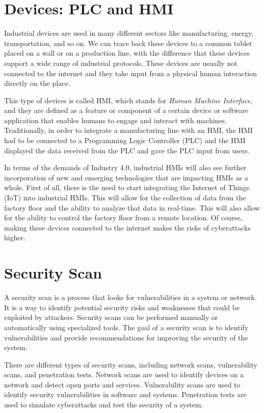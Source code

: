 \section{Devices: PLC and HMI}

Industrial devices are used in many different sectors like manufacturing, energy, transportation, and so on. We can trace back these devices to a common tablet placed on a wall or on a production line, with the difference that these devices support a wide range of industrial protocols. These devices are usually not connected to the internet and they take input from a physical human interaction directly on the place.

This type of devices is called HMI, which stands for \textit{Human Machine Interface}, and they are defined as a feature or component of a certain device or software application that enables humans to engage and interact with machines.\\
Traditionally, in order to integrate a manufacturing line with an HMI, the HMI had to be connected to a Programming Logic Controller (PLC) and the HMI displayed the data received from the PLC and gave the PLC input from users.~\cite{what-is-hmi}

In terms of the demands of Industry 4.0, industrial HMIs will also see further incorporation of new and emerging technologies that are impacting HMIs as a whole. First of all, there is the need to start integrating the Internet of Things (IoT) into industrial HMIs. This will allow for the collection of data from the factory floor and the ability to analyze that data in real-time. This will also allow for the ability to control the factory floor from a remote location. Of course, making these devices connected to the internet makes the risks of cyberattacks higher.

\section{Security Scan}

A security scan is a process that looks for vulnerabilities in a system or network. It is a way to identify potential security risks and weaknesses that could be exploited by attackers. Security scans can be performed manually or automatically using specialized tools. The goal of a security scan is to identify vulnerabilities and provide recommendations for improving the security of the system.

There are different types of security scans, including network scans, vulnerability scans, and penetration tests. Network scans are used to identify devices on a network and detect open ports and services. Vulnerability scans are used to identify security vulnerabilities in software and systems. Penetration tests are used to simulate cyberattacks and test the security of a system.


